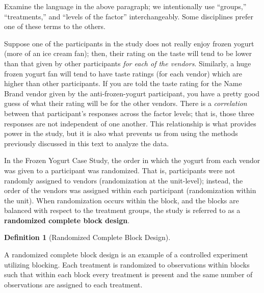 \documentclass[
  letterpaper,
  DIV=11,
  numbers=noendperiod]{scrreprt}
\theoremstyle{definition}
\newtheorem{definition}{Definition}[chapter]
\theoremstyle{definition}
\theoremstyle{plain}
\theoremstyle{remark}
\begin{document}
\begin{tcolorbox}[enhanced jigsaw, colbacktitle=quarto-callout-note-color!10!white, colback=white, left=2mm, title=\textcolor{quarto-callout-note-color}{\faInfo}\hspace{0.5em}{Note}, toptitle=1mm, leftrule=.75mm, breakable, bottomrule=.15mm, arc=.35mm, rightrule=.15mm, toprule=.15mm, coltitle=black, opacityback=0, colframe=quarto-callout-note-color-frame, opacitybacktitle=0.6, bottomtitle=1mm, titlerule=0mm]

Examine the language in the above paragraph; we intentionally use
``groups,'' ``treatments,'' and ``levels of the factor''
interchangeably. Some disciplines prefer one of these terms to the
others.

\end{tcolorbox}

Suppose one of the participants in the study does not really enjoy
frozen yogurt (more of an ice cream fan); then, their rating on the
taste will tend to be lower than that given by other participants
\emph{for each of the vendors}. Similarly, a huge frozen yogurt fan will
tend to have taste ratings (for each vendor) which are higher than other
participants. If you are told the taste rating for the Name Brand vendor
given by the anti-frozen-yogurt participant, you have a pretty good
guess of what their rating will be for the other vendors. There is a
\emph{correlation} between that participant's responses across the
factor levels; that is, those three responses are not independent of one
another. This relationship is what provides power in the study, but it
is also what prevents us from using the methods previously discussed in
this text to analyze the data.

In the Frozen Yogurt Case Study, the order in which the yogurt from each
vendor was given to a participant was randomized. That is, participants
were not randomly assigned to vendors (randomization at the unit-level);
instead, the order of the vendors was assigned within each participant
(randomization within the unit). When randomization occurs within the
block, and the blocks are balanced with respect to the treatment groups,
the study is referred to as a \textbf{randomized complete block design}.

\begin{definition}[Randomized Complete Block
Design]\protect\hypertarget{def-rcbd}{}\label{def-rcbd}

A randomized complete block design is an example of a controlled
experiment utilizing blocking. Each treatment is randomized to
observations within blocks such that within each block every treatment
is present and the same number of observations are assigned to each
treatment.

\end{definition}
\end{document}
